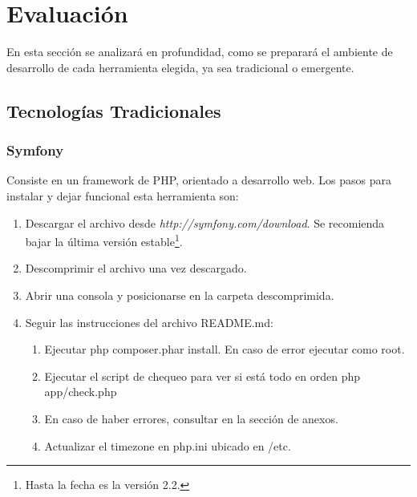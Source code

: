 \section{Evaluación}

En esta sección se analizará en profundidad, como se preparará el ambiente de desarrollo de cada herramienta elegida, ya sea 
tradicional o emergente.\\

\subsection{Tecnologías Tradicionales}


\subsubsection{Symfony}

Consiste en un framework de PHP, orientado a desarrollo web. Los pasos para instalar y dejar funcional esta herramienta son:

\begin{enumerate}
 \item Descargar el archivo desde \textit{http://symfony.com/download}. Se recomienda bajar la última versión 
       estable\footnote{Hasta la fecha es la versión 2.2.}.
 \item Descomprimir el archivo una vez descargado.
 \item Abrir una consola y posicionarse en la carpeta descomprimida.
 \item Seguir las instrucciones del archivo README.md:
 \begin{enumerate}
  \item Ejecutar php composer.phar install. En caso de error ejecutar como root.
  \item Ejecutar el script de chequeo para ver si está todo en orden php app/check.php
  \item En caso de haber errores, consultar en la sección de anexos.
  \item Actualizar el timezone en php.ini ubicado en /etc.
 \end{enumerate}
\end{enumerate}


